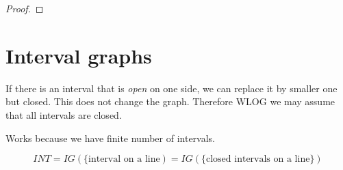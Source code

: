 \begin{proof}

\end{proof}

\section{\texorpdfstring{Interval graphs}{Interval graphs}}
\vspace{5mm}
\large

If there is an interval that is \emph{open} on one side, we can replace it by smaller one but closed.
This does not change the graph.
Therefore WLOG we may assume that all intervals are closed.

Works because we have finite number of intervals.

\begin{definition}
	\[ INT = IG(\{\text{interval on a line}) = IG(\{\text{closed intervals on a line}\}) \]
\end{definition}

